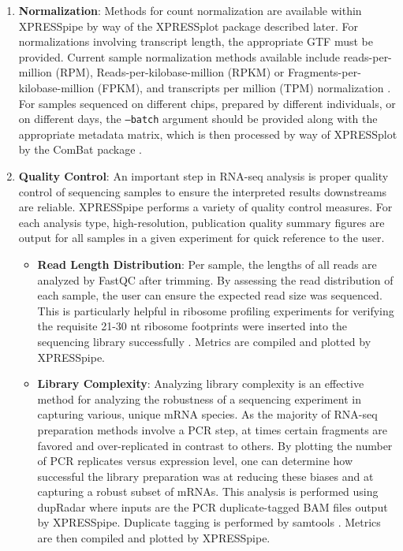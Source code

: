 \documentclass[11pt, a4paper, oneside]{article}
\begin{document}
\begin{enumerate}
  \item \textbf{Normalization}: Methods for count normalization are available within XPRESSpipe by way of the XPRESSplot package described later. For normalizations involving transcript length, the appropriate GTF must be provided. Current sample normalization methods available include reads-per-million (RPM), Reads-per-kilobase-million (RPKM) or Fragments-per-kilobase-million (FPKM), and transcripts per million (TPM) normalization \cite{evans_briefbio}. For samples sequenced on different chips, prepared by different individuals, or on different days, the \texttt{--batch} argument should be provided along with the appropriate metadata matrix, which is then processed by way of XPRESSplot by the ComBat package \cite{sva}.

  \item \textbf{Quality Control}:
  An important step in RNA-seq analysis is proper quality control of sequencing samples to ensure the interpreted results downstreams are reliable. XPRESSpipe performs a variety of quality control measures. For each analysis type, high-resolution, publication quality summary figures are output for all samples in a given experiment for quick reference to the user.

    \begin{itemize}
      \item \textbf{Read Length Distribution}: Per sample, the lengths of all reads are analyzed by FastQC \cite{fastqc} after trimming. By assessing the read distribution of each sample, the user can ensure the expected read size was sequenced. This is particularly helpful in ribosome profiling experiments for verifying the requisite 21-30 nt ribosome footprints were inserted into the sequencing library successfully \cite{ingolia_meth}. Metrics are compiled and plotted by XPRESSpipe.

      \item \textbf{Library Complexity}: Analyzing library complexity is an effective method for analyzing the robustness of a sequencing experiment in capturing various, unique mRNA species. As the majority of RNA-seq preparation methods involve a PCR step, at times certain fragments are favored and over-replicated in contrast to others. By plotting the number of PCR replicates versus expression level, one can determine how successful the library preparation was at reducing these biases and at capturing a robust subset of mRNAs. This analysis is performed using dupRadar \cite{dupradar} where inputs are the PCR duplicate-tagged BAM files output by XPRESSpipe. Duplicate tagging is performed by samtools \cite{samtools}. Metrics are then compiled and plotted by XPRESSpipe.


\end{itemize}
\end{enumerate}
\end{document}
